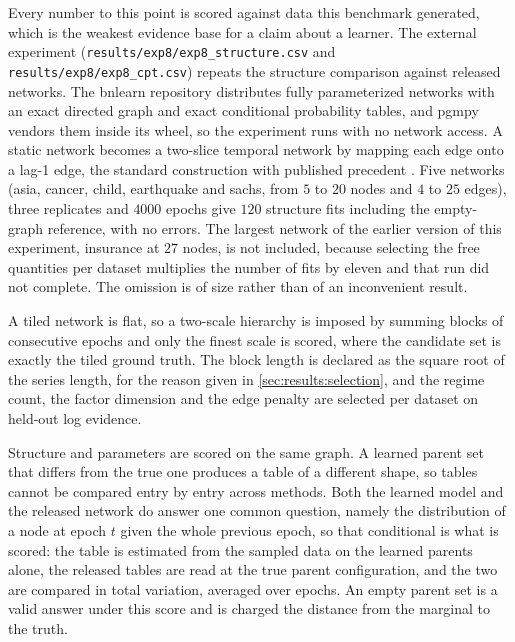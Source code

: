 Every number to this point is scored against data this benchmark generated,
which is the weakest evidence base for a claim about a learner. The external
experiment (\texttt{results/exp8/exp8\_structure.csv} and
\texttt{results/exp8/exp8\_cpt.csv}) repeats the structure comparison against
released networks. The bnlearn repository \citep{scutari2010bnlearn}
distributes fully parameterized networks with an exact directed graph and exact
conditional probability tables, and pgmpy \citep{ankan2024pgmpy} vendors them
inside its wheel, so the experiment runs with no network access. A static
network becomes a two-slice temporal network by mapping each edge onto a lag-1
edge, the standard construction with published precedent
\citep{trabelsi2013benchmarking, ouyang2023divideconquer}. Five networks (asia,
cancer, child, earthquake and sachs, from $5$ to $20$ nodes and $4$ to $25$
edges), three replicates and $4000$ epochs give $120$ structure fits including
the empty-graph reference, with no errors. The largest network of the earlier
version of this experiment, insurance at $27$ nodes, is not included, because
selecting the free quantities per dataset multiplies the number of fits by
eleven and that run did not complete. The omission is of size rather than of an
inconvenient result.

A tiled network is flat, so a two-scale hierarchy is imposed by summing blocks
of consecutive epochs and only the finest scale is scored, where the candidate
set is exactly the tiled ground truth. The block length is declared as the
square root of the series length, for the reason given in
\cref{sec:results:selection}, and the regime count, the factor dimension and
the edge penalty are selected per dataset on held-out log evidence.

Structure and parameters are scored on the same graph. A learned parent set
that differs from the true one produces a table of a different shape, so tables
cannot be compared entry by entry across methods. Both the learned model and
the released network do answer one common question, namely the distribution of
a node at epoch $t$ given the whole previous epoch, so that conditional is what
is scored: the table is estimated from the sampled data on the learned parents
alone, the released tables are read at the true parent configuration, and the
two are compared in total variation, averaged over epochs. An empty parent set
is a valid answer under this score and is charged the distance from the
marginal to the truth.


